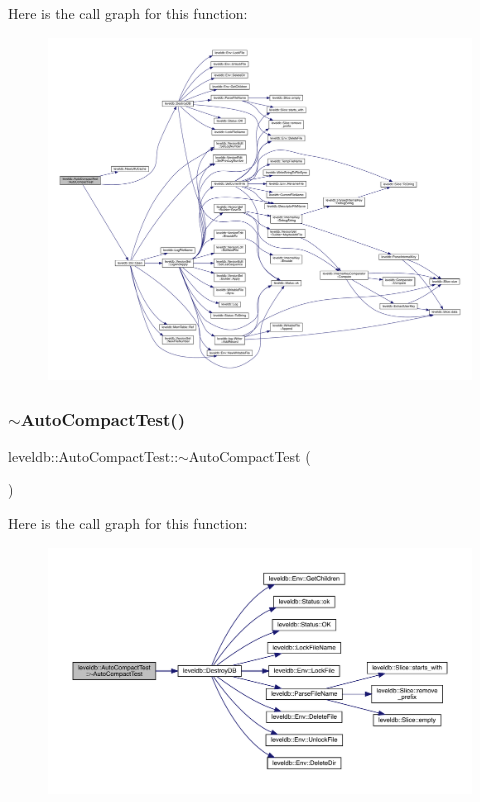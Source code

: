 Here is the call graph for this function\+:
\nopagebreak
\begin{figure}[H]
\begin{center}
\leavevmode
\includegraphics[width=350pt]{classleveldb_1_1_auto_compact_test_a31fe0ded855f188fac1650c70849760c_cgraph}
\end{center}
\end{figure}
\mbox{\label{classleveldb_1_1_auto_compact_test_a671873887bb99ee3731add4298a8df0b}} 
\subsubsection{\texorpdfstring{$\sim$AutoCompactTest()}{~AutoCompactTest()}}
{\footnotesize\ttfamily leveldb\+::\+Auto\+Compact\+Test\+::$\sim$\+Auto\+Compact\+Test (\begin{DoxyParamCaption}{ }\end{DoxyParamCaption})\hspace{0.3cm}{\ttfamily [inline]}}

Here is the call graph for this function\+:
\nopagebreak
\begin{figure}[H]
\begin{center}
\leavevmode
\includegraphics[width=350pt]{classleveldb_1_1_auto_compact_test_a671873887bb99ee3731add4298a8df0b_cgraph}
\end{center}
\end{figure}


